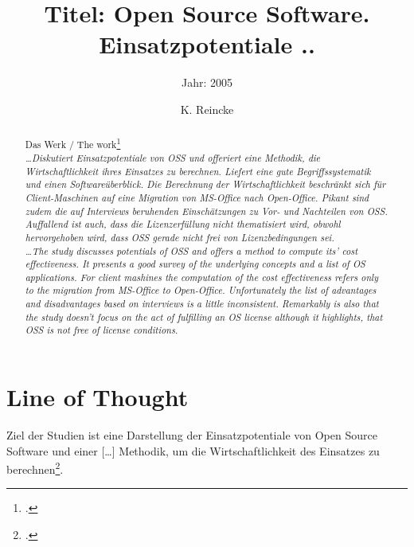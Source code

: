 \documentclass[DIV=calc,BCOR=5mm,11pt,headings=small,oneside,abstract=true, toc=bib]{scrartcl}
\begin{document}

\titlehead{Literaturexzerpt}
\subject{Autor(en): Renner, Thomas \ldots}
\title{Titel: Open Source Software. Einsatzpotentiale ..}
\subtitle{Jahr: 2005 }
\author{K. Reincke}

\maketitle

\begin{abstract}
\noindent
Das Werk / The work\footcite[][]{RenVetRexKet2005a} \\
\noindent \itshape
\ldots Diskutiert Einsatzpotentiale von OSS und offeriert eine Methodik, die
Wirtschaftlichkeit ihres Einsatzes zu berechnen. Liefert eine gute
Begriffssystematik und einen Softwareüberblick. Die Berechnung der
Wirtschaftlichkeit beschränkt sich für Client-Maschinen auf eine Migration von
MS-Office nach Open-Office. Pikant sind zudem die auf Interviews beruhenden
Einschätzungen zu Vor- und Nachteilen von OSS. Auffallend ist auch, dass die
Lizenzerfüllung nicht thematisiert wird, obwohl hervorgehoben wird, dass OSS
gerade nicht frei von Lizenzbedingungen sei. \\
\noindent
\ldots The study discusses potentials of OSS and offers a method to compute its'
cost effectiveness. It presents a good survey of the underlying concepts and a
list of OS applications. For client mashines the computation of the cost
effectiveness refers only to the migration from MS-Office to Open-Office.
Unfortunately the list of advantages and disadvantages based on interviews is a
little inconsistent. Remarkably is also that the study doesn't focus on the act
of fulfilling an OS license although it highlights, that OSS is not free of
license conditions.

\end{abstract}
\footnotesize
\normalsize

\section{Line of Thought}

Ziel der Studien ist eine Darstellung der \glqq{}Einsatzpotentiale von
Open Source Software\grqq{} und einer \glqq{}[\ldots] Methodik, um die
Wirtschaftlichkeit des Einsatzes zu
berechnen\grqq{}\footcite[vgl.][10]{RenVetRexKet2005a}.
\end{document}
